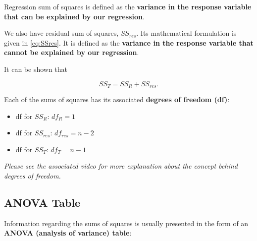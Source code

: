 \documentclass[
]{book}
\providecommand{\tightlist}{%
  \setlength{\itemsep}{0pt}\setlength{\parskip}{0pt}}
\begin{document}
Regression sum of squares is defined as the \textbf{variance in the response variable that can be explained by our regression}.

We also have residual sum of squares, \(SS_{res}\). Its mathematical formulation is given in \eqref{eq:SSres}. It is defined as the \textbf{variance in the response variable that cannot be explained by our regression}.

It can be shown that

\begin{equation}
SS_T = SS_R + SS_{res}.
\label{eq:SS}
\end{equation}

Each of the sums of squares has its associated \textbf{degrees of freedom (df)}:

\begin{itemize}
\tightlist
\item
  df for \(SS_R\): \(df_R = 1\)
\item
  df for \(SS_{res}\): \(df_{res} = n-2\)
\item
  df for \(SS_T\): \(df_T = n-1\)
\end{itemize}

\emph{Please see the associated video for more explanation about the concept behind degrees of freedom.}

\hypertarget{anova-table}{%
\subsection{ANOVA Table}\label{anova-table}}

Information regarding the sums of squares is usually presented in the form of an \textbf{ANOVA (analysis of variance) table}:
\end{document}
